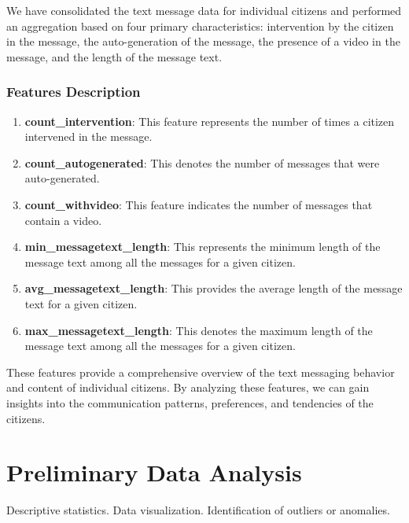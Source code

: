\documentclass[12pt]{article}
\begin{document}
We have consolidated the text message data for individual citizens and performed an aggregation based on four primary characteristics: intervention by the citizen in the message, the auto-generation of the message, the presence of a video in the message, and the length of the message text.

\subsubsection{Features Description}

\begin{enumerate}
    \item \textbf{count\_intervention}: This feature represents the number of times a citizen intervened in the message.
    
    \item \textbf{count\_autogenerated}: This denotes the number of messages that were auto-generated.
    
    \item \textbf{count\_withvideo}: This feature indicates the number of messages that contain a video.
    
    \item \textbf{min\_messagetext\_length}: This represents the minimum length of the message text among all the messages for a given citizen.
    
    \item \textbf{avg\_messagetext\_length}: This provides the average length of the message text for a given citizen.
    
    \item \textbf{max\_messagetext\_length}: This denotes the maximum length of the message text among all the messages for a given citizen.
\end{enumerate}

These features provide a comprehensive overview of the text messaging behavior and content of individual citizens. By analyzing these features, we can gain insights into the communication patterns, preferences, and tendencies of the citizens.


\section{Preliminary Data Analysis}

Descriptive statistics.
Data visualization.
Identification of outliers or anomalies.

\end{document}
